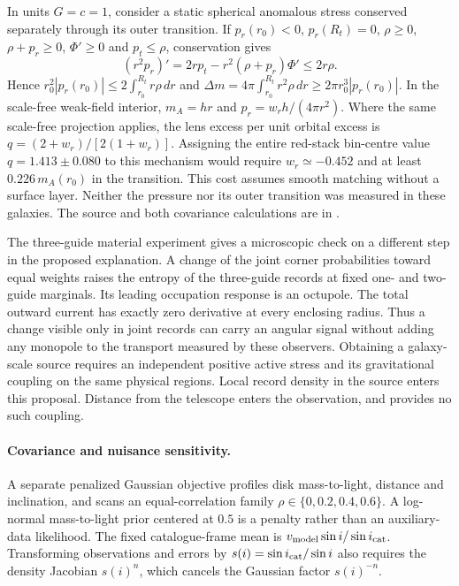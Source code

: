 \documentclass[11pt]{article}
\begin{document}
In units $G=c=1$, consider a static spherical anomalous stress
conserved separately through its outer transition. If $p_r(r_0)<0$,
$p_r(R_t)=0$, $\rho\ge0$, $\rho+p_r\ge0$, $\Phi'\ge0$ and
$p_t\le\rho$, conservation gives
\[
 (r^2p_r)'=2rp_t-r^2(\rho+p_r)\Phi'\le2r\rho .
\]
Hence $r_0^2 |p_r(r_0)|\le2\int_{r_0}^{R_t}r\rho\,dr$ and
$\Delta m=4\pi\int_{r_0}^{R_t}r^2\rho\,dr
\ge2\pi r_0^3|p_r(r_0)|$. In the scale-free weak-field interior,
$m_A=hr$ and $p_r=w_r h/(4\pi r^2)$. Where the same scale-free
projection applies, the lens excess per unit orbital excess is
$q=(2+w_r)/[2(1+w_r)]$. Assigning the entire red-stack bin-centre
value $q=1.413\pm0.080$ to this mechanism would require
$w_r\simeq-0.452$ and at least $0.226\,m_A(r_0)$ in the transition.
This cost assumes smooth matching without a surface layer. Neither the
pressure nor its outer transition was measured in these galaxies.
The source and both covariance calculations are in
.

The three-guide material experiment gives a microscopic check on a
different step in the proposed explanation. A change of the joint
corner probabilities toward equal weights raises the entropy of the three-guide records
at fixed one- and two-guide marginals. Its leading occupation response
is an octupole. The total outward current has exactly zero derivative
at every enclosing radius. Thus a change visible only in joint records
can carry an angular signal without adding any monopole to the
transport measured by these observers. Obtaining a galaxy-scale source
requires an independent positive active stress and its gravitational
coupling on the same physical regions. Local record density in the
source enters this proposal. Distance from the telescope enters the
observation, and provides no such coupling.

\paragraph{Covariance and nuisance sensitivity.}
A separate penalized Gaussian objective profiles disk mass-to-light,
distance and inclination, and scans an equal-correlation family
\(\rho\in\{0,0.2,0.4,0.6\}\). A log-normal mass-to-light prior centered
at \(0.5\) is a penalty rather than an auxiliary-data likelihood.
The fixed catalogue-frame mean is
\(v_{\rm model}\sin i/\sin i_{\rm cat}\). Transforming observations and
errors by \(s(i)=\sin i_{\rm cat}/\sin i\) also requires the density
Jacobian \(s(i)^n\), which cancels the Gaussian factor \(s(i)^{-n}\).
\end{document}
